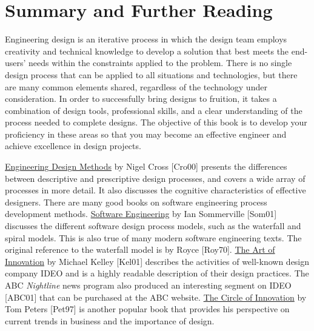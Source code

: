 \section{Summary and Further
Reading}\label{summary-and-further-reading}

Engineering design is an iterative process in which the design team
employs creativity and technical knowledge to develop a solution that
best meets the end-users' needs within the constraints applied to the
problem. There is no single design process that can be applied to all
situations and technologies, but there are many common elements shared,
regardless of the technology under consideration. In order to
successfully bring designs to fruition, it takes a combination of design
tools, professional skills, and a clear understanding of the process
needed to complete designs. The objective of this book is to develop
your proficiency in these areas so that you may become an effective
engineer and achieve excellence in design projects.

\underline{Engineering Design Methods} by Nigel Cross {[}Cro00{]} presents the
differences between descriptive and prescriptive design processes, and
covers a wide array of processes in more detail. It also discusses the
cognitive characteristics of effective designers. There are many good
books on software engineering process development methods. \underline{Software
Engineering} by Ian Sommerville {[}Som01{]} discusses the different
software design process models, such as the waterfall and spiral models.
This is also true of many modern software engineering texts. The
original reference to the waterfall model is by Royce {[}Roy70{]}.
\underline{The Art of Innovation} by Michael Kelley {[}Kel01{]} describes the
activities of well-known design company IDEO and is a highly readable
description of their design practices. The ABC \emph{Nightline} news
program also produced an interesting segment on IDEO {[}ABC01{]} that
can be purchased at the ABC website. \underline{The Circle of Innovation} by
Tom Peters {[}Pet97{]} is another popular book that provides his
perspective on current trends in business and the importance of design.

